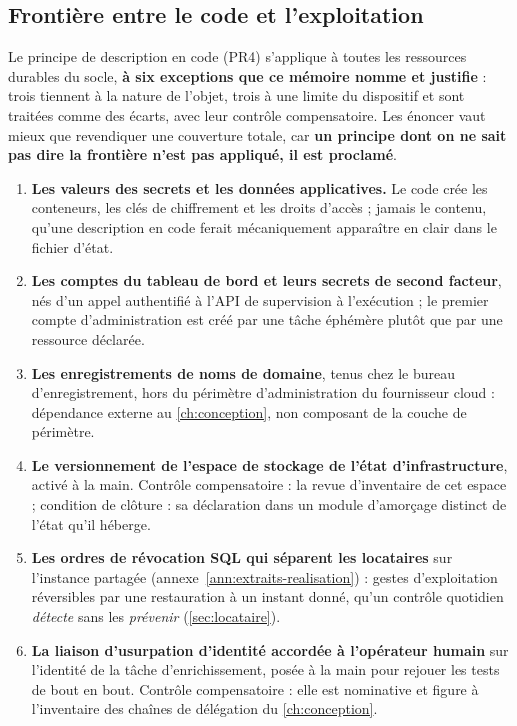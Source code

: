 \subsection{Frontière entre le code et l'exploitation}
\label{subsec:frontiere-code}

Le principe de description en code (PR4) s'applique à toutes les ressources durables du socle,
\textbf{à six exceptions que ce mémoire nomme et justifie} : trois tiennent à la nature de l'objet,
trois à une limite du dispositif et sont traitées comme des écarts, avec leur contrôle
compensatoire. Les énoncer vaut mieux que revendiquer une couverture totale, car \textbf{un principe
dont on ne sait pas dire la frontière n'est pas appliqué, il est proclamé}.

\begin{enumerate}\itemsep0pt
\item \textbf{Les valeurs des secrets et les données applicatives.} Le code crée les conteneurs,
les clés de chiffrement et les droits d'accès ; jamais le contenu, qu'une description en code ferait
mécaniquement apparaître en clair dans le fichier d'état.
\item \textbf{Les comptes du tableau de bord et leurs secrets de second facteur}, nés d'un appel
authentifié à l'API de supervision à l'exécution ; le premier compte d'administration est créé par
une tâche éphémère plutôt que par une ressource déclarée.
\item \textbf{Les enregistrements de noms de domaine}, tenus chez le bureau d'enregistrement, hors
du périmètre d'administration du fournisseur cloud : dépendance externe au \cref{ch:conception}, non composant
de la couche de périmètre.
\item \textbf{Le versionnement de l'espace de stockage de l'état d'infrastructure}, activé à la
main. Contrôle compensatoire : la revue d'inventaire de cet espace ; condition de clôture : sa
déclaration dans un module d'amorçage distinct de l'état qu'il héberge.
\item \textbf{Les ordres de révocation SQL qui séparent les locataires} sur l'instance partagée
(annexe~\ref{ann:extraits-realisation}) : gestes d'exploitation réversibles par une restauration à
un instant donné, qu'un contrôle quotidien \emph{détecte} sans les \emph{prévenir}
(\cref{sec:locataire}).
\item \textbf{La liaison d'usurpation d'identité accordée à l'opérateur humain} sur l'identité de la
tâche d'enrichissement, posée à la main pour rejouer les tests de bout en bout. Contrôle
compensatoire : elle est nominative et figure à l'inventaire des chaînes de délégation du
\cref{ch:conception}.
\end{enumerate}

